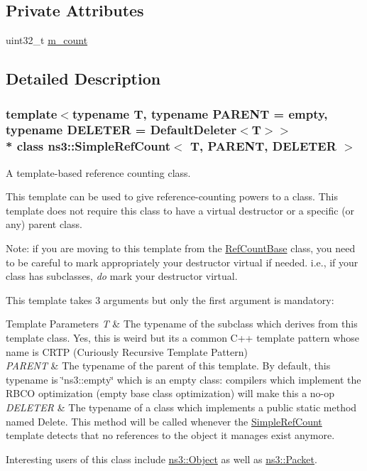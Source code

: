 \subsection*{Private Attributes}
\begin{DoxyCompactItemize}
\item 
uint32\+\_\+t \hyperlink{classns3_1_1SimpleRefCount_ae4c6daa11a1ad9add971e129fc31fc85}{m\+\_\+count}
\end{DoxyCompactItemize}


\subsection{Detailed Description}
\subsubsection*{template$<$typename T, typename P\+A\+R\+E\+NT = empty, typename D\+E\+L\+E\+T\+ER = Default\+Deleter$<$\+T$>$$>$\\*
class ns3\+::\+Simple\+Ref\+Count$<$ T, P\+A\+R\+E\+N\+T, D\+E\+L\+E\+T\+E\+R $>$}

A template-\/based reference counting class. 

This template can be used to give reference-\/counting powers to a class. This template does not require this class to have a virtual destructor or a specific (or any) parent class.

Note\+: if you are moving to this template from the \hyperlink{classns3_1_1RefCountBase}{Ref\+Count\+Base} class, you need to be careful to mark appropriately your destructor virtual if needed. i.\+e., if your class has subclasses, {\itshape do} mark your destructor virtual.

This template takes 3 arguments but only the first argument is mandatory\+:


\begin{DoxyTemplParams}{Template Parameters}
{\em T} & The typename of the subclass which derives from this template class. Yes, this is weird but it\textquotesingle{}s a common C++ template pattern whose name is C\+R\+TP (Curiously Recursive Template Pattern) \\
\hline
{\em P\+A\+R\+E\+NT} & The typename of the parent of this template. By default, this typename is \char`\"{}\textquotesingle{}ns3\+::empty\textquotesingle{}\char`\"{} which is an empty class\+: compilers which implement the R\+B\+CO optimization (empty base class optimization) will make this a no-\/op \\
\hline
{\em D\+E\+L\+E\+T\+ER} & The typename of a class which implements a public static method named \textquotesingle{}Delete\textquotesingle{}. This method will be called whenever the \hyperlink{classns3_1_1SimpleRefCount}{Simple\+Ref\+Count} template detects that no references to the object it manages exist anymore.\\
\hline
\end{DoxyTemplParams}
Interesting users of this class include \hyperlink{classns3_1_1Object}{ns3\+::\+Object} as well as \hyperlink{classns3_1_1Packet}{ns3\+::\+Packet}. 

